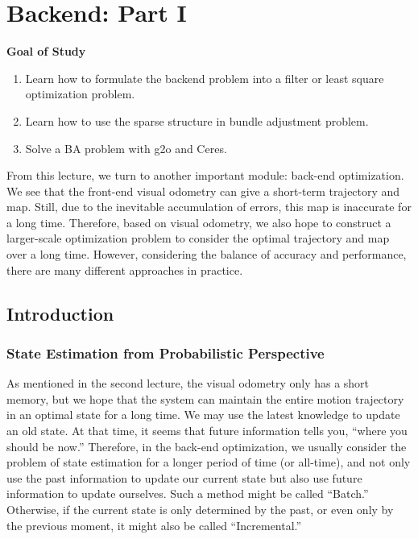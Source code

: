 \chapter{Backend: Part I}
\label{cpt:backend1}
\begin{mdframed}  
	\textbf{Goal of Study}
	\begin{enumerate}[labelindent=0em,leftmargin=1.5em]
		\item Learn how to formulate the backend problem into a filter or least square optimization problem.
		\item Learn how to use the sparse structure in bundle adjustment problem. 
		\item Solve a BA problem with g2o and Ceres.
	\end{enumerate}
\end{mdframed}

From this lecture, we turn to another important module: back-end optimization.
We see that the front-end visual odometry can give a short-term trajectory and map. Still, due to the inevitable accumulation of errors, this map is inaccurate for a long time. Therefore, based on visual odometry, we also hope to construct a larger-scale optimization problem to consider the optimal trajectory and map over a long time. However, considering the balance of accuracy and performance, there are many different approaches in practice.

\newpage


\newpage
\section{Introduction}
\subsection{State Estimation from Probabilistic Perspective}
As mentioned in the second lecture, the visual odometry only has a short memory, but we hope that the system can maintain the entire motion trajectory in an optimal state for a long time. We may use the latest knowledge to update an old state. At that time, it seems that future information tells you, ``where you should be now.'' Therefore, in the back-end optimization, we usually consider the problem of state estimation for a longer period of time (or all-time), and not only use the past information to update our current state but also use future information to update ourselves. Such a method might be called ``Batch.'' Otherwise, if the current state is only determined by the past, or even only by the previous moment, it might also be called ``Incremental.''

